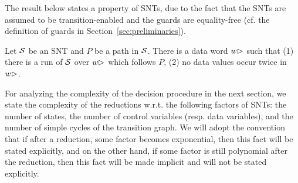 
The result below states a property of SNTs, due to the fact that the SNTs are assumed to be transition-enabled and the guards are equality-free (cf. the definition of guards in Section~\ref{sec:preliminaries}).

\begin{proposition}\label{prop-snt-distinct-value}
Let ${\mathcal{S} }$ be an SNT and $P$ be a path in ${\mathcal{S} }$. There is a data word $w\rhd$ such that (1) there is a run of ${\mathcal{S} }$ over $w\rhd$ which follows $P$, (2) no data values occur twice in~$w\rhd$.
\end{proposition}

For analyzing the complexity of the decision procedure in the next section,  we state the complexity of the reductions w.r.t. the following factors of SNTs: the number of states, the number of control variables (resp. data variables), and the number of simple cycles of the transition graph. We will adopt the convention that if after a reduction, some factor becomes exponential, then this fact will be stated explicitly, and on the other hand, if some factor is still polynomial after the reduction, then this fact will be made implicit and will not be stated explicitly. 



